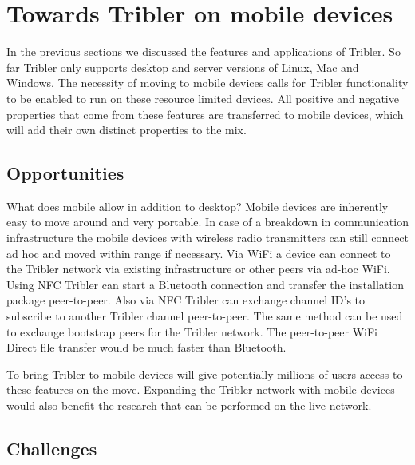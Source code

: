 \section{Towards Tribler on mobile devices}\label{ch:tribler_mobile}

In the previous sections we discussed the features and applications of Tribler.
So far Tribler only supports desktop and server versions of Linux, Mac and Windows.
The necessity of moving to mobile devices calls for Tribler functionality to be enabled to run on these resource limited devices.
All positive and negative properties that come from these features are transferred to mobile devices, which will add their own distinct properties to the mix.



\subsection{Opportunities}

What does mobile allow in addition to desktop?
Mobile devices are inherently easy to move around and very portable.
In case of a breakdown in communication infrastructure the mobile devices with wireless radio transmitters can still connect ad hoc and moved within range if necessary.
Via WiFi a device can connect to the Tribler network via existing infrastructure or other peers via ad-hoc WiFi.
Using NFC Tribler can start a Bluetooth connection and transfer the installation package peer-to-peer.
Also via NFC Tribler can exchange channel ID's to subscribe to another Tribler channel peer-to-peer.
The same method can be used to exchange bootstrap peers for the Tribler network.
The peer-to-peer WiFi Direct file transfer would be much faster than Bluetooth.


To bring Tribler to mobile devices will give potentially millions of users access to these features on the move.
Expanding the Tribler network with mobile devices would also benefit the research that can be performed on the live network.


\subsection{Challenges}

